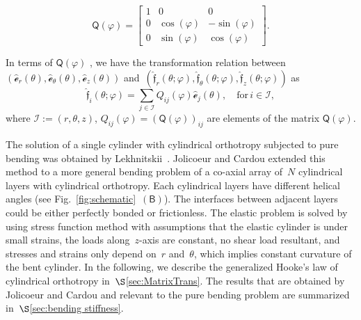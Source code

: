 \documentclass[preprint,10pt,times]{elsarticle}
\numberwithin{equation}{section}
\newcommand{\physe}{\hat{\mathscr{e}}} %
\newcommand{\physf}{\hat{\boldsymbol{\mathfrak{f}}}}
\renewcommand{\u}[1]{\boldsymbol{#1}}
\newcommand{\usf}[1]{\u{\mathsf #1}}
\newcommand{\pr}[1]{\left( #1 \right)}
\newcommand{\subf}[1]{\pr{\textsf{#1}}}
\renewcommand{\>}{$\Rightarrow$}
\begin{document}
\begin{equation}
\usf{Q}(\varphi)
= \begin{bmatrix}
1 & 0 & 0 \\
 0 & \cos(\varphi) & -\sin(\varphi) \\
 0 & \sin(\varphi) & \cos(\varphi)
 \end{bmatrix}.
\end{equation}

In terms of $\usf{Q}(\varphi)$ , we have the transformation relation between~$(\physe_{r}(\theta),\physe_{\theta}(\theta),\physe_{z}(\theta))$ and~$\pr{\physf_{r}(\theta;\varphi),\physf_{\theta}(\theta;\varphi),\physf_{z}(\theta;\varphi)}$ as
\begin{equation}
\physf_{i} (\theta;\varphi) = \sum_{j \in \mathcal{I} } Q_{ij}(\varphi)\physe_{j}(\theta), \quad \text{for} \,i \in \mathcal{I} ,
\label{eq:Qtransform}
\end{equation}
where $\mathcal{I} :=\pr{r,\theta,z}$,  $Q_{ij}(\varphi) = \pr{\usf{Q}(\varphi)}_{ij}$ are elements of the matrix $\usf{Q}(\varphi)$.


The solution of a single cylinder with cylindrical orthotropy subjected to pure bending was obtained by Lekhnitskii~\cite{Lekhnitskii1981}. Jolicoeur and Cardou extended this method to a more general bending problem of a co-axial array of~$N$ cylindrical layers with cylindrical orthotropy. Each cylindrical layers have different helical angles (see Fig.~\ref{fig:schematic}~$\subf{B}$). The interfaces between adjacent layers could be either perfectly bonded or frictionless. The elastic problem is solved by using stress function method with assumptions that the elastic cylinder is under small strains, the loads along~$z$-axis are constant, no shear load resultant, and stresses and strains only depend on~$r$ and~$\theta$, which implies constant curvature of the bent cylinder. In the following, we describe the generalized Hooke's law of cylindrical orthotropy in~$\S$\ref{sec:MatrixTrans}. The results that are obtained by Jolicoeur and Cardou and relevant to the pure bending problem are summarized in~$\S$\ref{sec:bending stiffness}.
\end{document}
